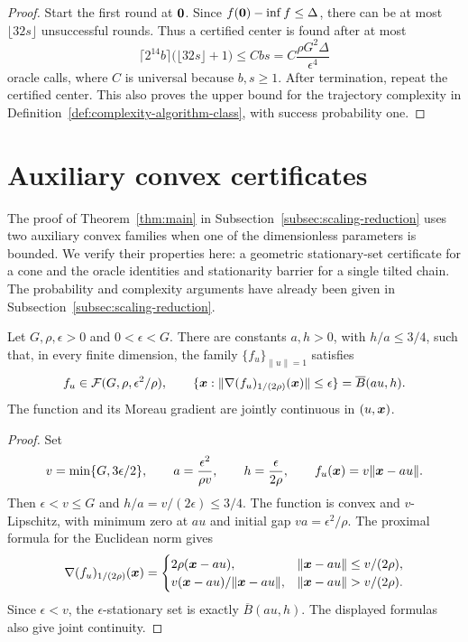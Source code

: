 \begin{appendix}
\begin{proof}
Start the first round at ${\mathbf 0}$. Since
$f({\mathbf 0})-\inf f\le\Delta$, there can be at most
$\lfloor32s\rfloor$ unsuccessful rounds. Thus a certified center
is found after at most
\[
 \lceil2^{14}b\rceil\bigl(\lfloor32s\rfloor+1\bigr)
 \le Cbs
 =C\frac{\rho G^2\Delta}{\epsilon^4}
\]
oracle calls, where $C$ is universal because $b,s\ge1$.
After termination, repeat the certified center. This also proves
the upper bound for the trajectory complexity in
Definition~\ref{def:complexity-algorithm-class}, with success
probability one.
\end{proof}



\section{Auxiliary convex certificates}
\label{app:principal-completion}
The proof of Theorem~\ref{thm:main} in
Subsection~\ref{subsec:scaling-reduction} uses two auxiliary convex
families when one of the dimensionless parameters is bounded.
We verify their properties here: a geometric stationary-set
certificate for a cone and the oracle identities and stationarity
barrier for a single tilted chain. The probability and complexity arguments
have already been given in Subsection~\ref{subsec:scaling-reduction}.

\begin{lemma}
\label{lem:one-query}
Let $G,\rho,\epsilon>0$ and $0<\epsilon<G$. There are constants
$a,h>0$, with $h/a\le3/4$, such that, in every finite dimension,
the family $\{f_u\}_{\|u\|=1}$ satisfies
\[
 f_u\in{\cal F}(G,\rho,\epsilon^2/\rho),\qquad
 \{\bm{x}:\|\nabla(f_u)_{1/(2\rho)}(\bm{x})\|\le\epsilon\}
 =\overline B(au,h).
\]
The function and its Moreau gradient are jointly continuous in
$(u,\bm{x})$.
\end{lemma}
\begin{proof}
Set
\[
 v=\min\{G,3\epsilon/2\},\qquad
 a=\frac{\epsilon^2}{\rho v},\qquad
 h=\frac{\epsilon}{2\rho},\qquad
 f_u(\bm{x})=v\|\bm{x}-au\|.
\]
Then $\epsilon<v\le G$ and $h/a=v/(2\epsilon)\le3/4$.
The function is convex and $v$-Lipschitz, with minimum zero at
$au$ and initial gap $va=\epsilon^2/\rho$.
The proximal formula for the Euclidean norm gives
\[
 \nabla(f_u)_{1/(2\rho)}(\x)=
 \begin{cases}
 2\rho(\x-au),&\|\x-au\|\le v/(2\rho),\\
 v(\x-au)/\|\x-au\|,&\|\x-au\|>v/(2\rho).
 \end{cases}
\]
Since $\epsilon<v$, the $\epsilon$-stationary set is exactly
$\overline B(au,h)$. The displayed formulas also give joint
continuity.
\end{proof}



\end{appendix}

